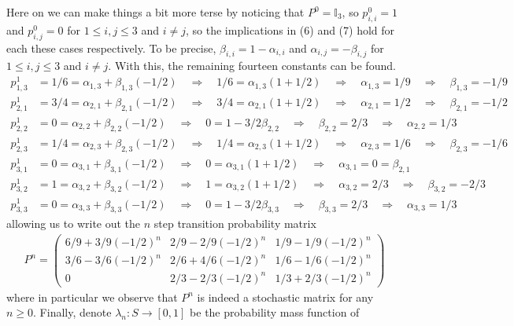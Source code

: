 \documentclass[11pt, letterpaper]{article}
\newcommand{\mbb}[1]{\mathbb{#1}}
\begin{document}
Here on we can make things a bit more terse by noticing that $P^0=\mbb{I}_3$, so $p^0_{i,i}=1$ and $p^0_{i,j}=0$ for $1\leq i,j\leq 3$ and $i\neq j$, so the implications in (6) and (7) hold
for each these cases respectively. To be precise, $\beta_{i,i}=1-\alpha_{i,i}$ and $\alpha_{i,j}=-\beta_{i,j}$ for $1\leq i,j\leq 3$ and $i\neq j$. With this, the remaining fourteen constants can be found.
\begin{align*}
    p_{1,3}^1&=1/6=\alpha_{1,3}+\beta_{1,3}(-1/2)\quad\Rightarrow\quad 1/6=\alpha_{1,3}(1+1/2)\quad\Rightarrow\quad\alpha_{1,3}=1/9\quad\Rightarrow\quad\beta_{1,3}=-1/9\\
    p_{2,1}^1&=3/4=\alpha_{2,1}+\beta_{2,1}(-1/2)\quad\Rightarrow\quad 3/4=\alpha_{2,1}(1+1/2)\quad\Rightarrow\quad\alpha_{2,1}=1/2\quad\Rightarrow\quad\beta_{2,1}=-1/2\\
    p_{2,2}^1&=0=\alpha_{2,2}+\beta_{2,2}(-1/2)\quad\Rightarrow\quad 0=1-3/2\beta_{2,2}\quad\Rightarrow\quad\beta_{2,2}=2/3\quad\Rightarrow\quad\alpha_{2,2}=1/3\\
    p_{2,3}^1&=1/4=\alpha_{2,3}+\beta_{2,3}(-1/2)\quad\Rightarrow\quad 1/4=\alpha_{2,3}(1+1/2)\quad\Rightarrow\quad\alpha_{2,3}=1/6\quad\Rightarrow\quad\beta_{2,3}=-1/6\\
    p_{3,1}^1&=0=\alpha_{3,1}+\beta_{3,1}(-1/2)\quad\Rightarrow\quad 0=\alpha_{3,1}(1+1/2)\quad\Rightarrow\quad\alpha_{3,1}=0=\beta_{2,1}\\
    p_{3,2}^1&=1=\alpha_{3,2}+\beta_{3,2}(-1/2)\quad\Rightarrow\quad 1=\alpha_{3,2}(1+1/2)\quad\Rightarrow\quad\alpha_{3,2}=2/3\quad\Rightarrow\quad\beta_{3,2}=-2/3\\
    p_{3,3}^1&=0=\alpha_{3,3}+\beta_{3,3}(-1/2)\quad\Rightarrow\quad 0=1-3/2\beta_{3,3}\quad\Rightarrow\quad\beta_{3,3}=2/3\quad\Rightarrow\quad\alpha_{3,3}=1/3
\end{align*}
allowing us to write out the $n$ step transition probability matrix
\begin{align*}
    P^n=\begin{pmatrix}
        6/9+3/9(-1/2)^n & 2/9 -2/9(-1/2)^n & 1/9 - 1/9(-1/2)^n\\
        3/6 - 3/6(-1/2)^n & 2/6+4/6(-1/2)^n & 1/6 - 1/6(-1/2)^n\\
        0 & 2/3 - 2/3(-1/2)^n & 1/3 + 2/3(-1/2)^n
    \end{pmatrix}
\end{align*}
where in particular we observe that $P^n$ is indeed a stochastic matrix for any $n\geq 0$. Finally, denote $\lambda_n:S\rightarrow[0,1]$ be the probability mass function of
\end{document}
